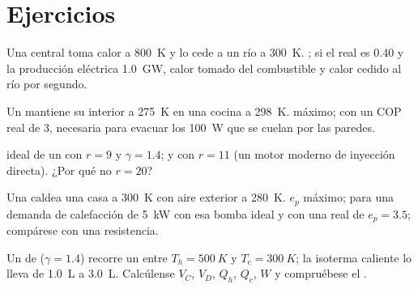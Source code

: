 \section{Ejercicios}

\begin{exercise}[$\star$]\label{exo:b1:heat-engines:1}
Una central toma calor a \qty{800}{K} y lo cede a un río a \qty{300}{K}.
; si el  real es $0.40$ y la producción
eléctrica \qty{1.0}{GW}, calor tomado del combustible y calor cedido al río
por segundo.
\end{exercise}

\begin{exercise}[$\star$]\label{exo:b1:heat-engines:2}
Un  mantiene su interior a \qty{275}{K} en una cocina a
\qty{298}{K}.  máximo; con un COP real de $3$,
 necesaria para evacuar los \qty{100}{W} que se cuelan
por las paredes.
\end{exercise}

\begin{exercise}[$\star$]\label{exo:b1:heat-engines:3}
 ideal de un  con $r = 9$ y $\gamma = 1.4$; y con
$r = 11$ (un motor moderno de inyección directa). ¿Por qué no $r = 20$?
\end{exercise}

\begin{exercise}[$\star$]\label{exo:b1:heat-engines:4}
Una  caldea una casa a \qty{300}{K} con aire exterior a \qty{280}{K}.
$e_p$ máximo;  para una demanda de calefacción de
\qty{5}{kW} con esa bomba ideal y con una real de $e_p = 3.5$; compárese con
una resistencia.
\end{exercise}

\begin{exercise}[$\star\star$]\label{exo:b1:heat-engines:5}
Un  de  ($\gamma = 1.4$) recorre un  entre
$T_h = \qty{500}{K}$ y $T_c = \qty{300}{K}$; la isoterma caliente lo lleva de
\qty{1.0}{L} a \qty{3.0}{L}. Calcúlense $V_C$, $V_D$, $Q_h$, $Q_c$, $W$ y
compruébese el .
\end{exercise}

